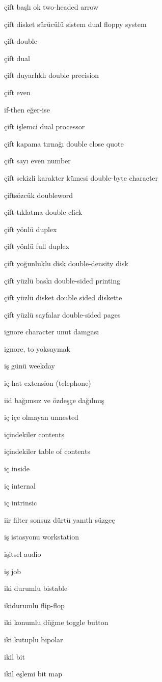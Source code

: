 \documentclass[12pt,fleqn]{article}\usepackage{../../common}
\begin{document}
çift başlı ok two-headed arrow

çift disket sürücülü sistem dual floppy system

çift double

çift dual

çift duyarlıklı double precision

çift even

if-then eğer-ise

çift işlemci dual processor

çift kapama tırnağı double close quote

çift sayı even number

çift sekizli karakter kümesi double-byte character

çiftsözcük doubleword

çift tıklatma double click

çift yönlü duplex

çift yönlü full duplex

çift yoğunluklu disk double-density disk

çift yüzlü baskı double-sided printing

çift yüzlü disket double sided diskette

çift yüzlü sayfalar double-sided pages

ignore character unut damgası

ignore, to yoksaymak

iş günü weekday

iç hat extension (telephone)

iid bağımsız ve özdeşçe dağılmış

iç içe olmayan unnested

içindekiler contents

içindekiler table of contents

iç inside

iç internal

iç intrinsic

iir filter sonsuz dürtü yanıtlı süzgeç

iş istasyonu workstation

işitsel audio

iş job

iki durumlu bistable

ikidurumlu flip-flop

iki konumlu düğme toggle button

iki kutuplu bipolar

ikil bit

ikil eşlemi bit map
\end{document}
